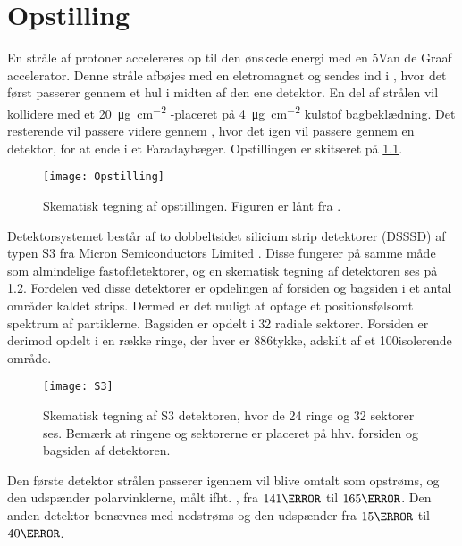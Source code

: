 \chapter{Opstilling}
\label{cha:opstilling}

En stråle af protoner accelereres op til den ønskede energi med en 5\MV Van de Graaf
accelerator. Denne stråle afbøjes med en eletromagnet og sendes ind i \beamline, hvor det først
passerer gennem et hul i midten af den ene detektor. En del af strålen vil kollidere med et
\SI[per-mode = symbol]{20}{\micro\gram\per\cm\squared} -\target placeret på
\SI[per-mode = symbol]{4}{\micro\gram\per\cm\squared} kulstof bagbeklædning.  Det resterende vil
passere videre gennem \beamline, hvor det igen vil passere gennem en detektor, for at ende i et
Faradaybæger. Opstillingen er skitseret på \cref{fig:opstilling}.
\begin{figure}[h]
  \centering
  \texttt{[image: Opstilling]}
  \caption{Skematisk tegning af opstillingen. Figuren er lånt fra \cite{Knudsen}.}
  \label{fig:opstilling}
\end{figure}

Detektorsystemet består af to dobbeltsidet silicium strip detektorer (DSSSD) af typen S3 fra Micron
Semiconductors Limited \cite{micron-s3}.    Disse
fungerer på samme måde som almindelige fastofdetektorer, og en skematisk tegning af detektoren ses
på \cref{fig:S3}.  Fordelen ved disse detektorer er opdelingen af forsiden og bagsiden i et antal
områder kaldet strips. Dermed er det muligt at optage et positionsfølsomt spektrum af
partiklerne. Bagsiden er opdelt i 32 radiale sektorer. Forsiden er derimod
opdelt i en række ringe, der hver er 886\um tykke, adskilt af et 100\um isolerende område.
\begin{figure}[hbt]
  \centering
  \texttt{[image: S3]}
  \caption{Skematisk tegning af S3 detektoren, hvor de 24 ringe og 32 sektorer ses. Bemærk at
  ringene og sektorerne er placeret på hhv. forsiden og bagsiden af detektoren.}
  \label{fig:S3}
\end{figure}

Den første detektor strålen passerer igennem vil blive omtalt som opstrøms, og den udspænder
polarvinklerne, målt ifht. \beamline, fra $141\degree$ til $165\degree$. Den anden detektor benævnes
med nedstrøms og den udspænder fra $15\degree$ til $40\degree$.

